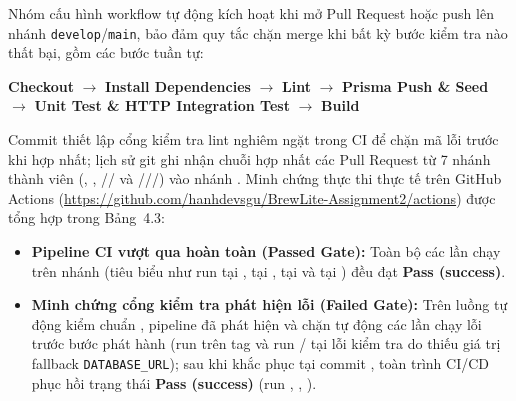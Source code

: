 \documentclass[12pt,a4paper]{report}
\begin{document}
Nhóm cấu hình workflow  tự động kích hoạt khi mở Pull Request hoặc push lên nhánh \texttt{develop}/\texttt{main}, bảo đảm quy tắc chặn merge khi bất kỳ bước kiểm tra nào thất bại, gồm các bước tuần tự:
\begin{center}
\textbf{Checkout} $\rightarrow$ \textbf{Install Dependencies} $\rightarrow$ \textbf{Lint} $\rightarrow$ \textbf{Prisma Push \& Seed} $\rightarrow$ \textbf{Unit Test \& HTTP Integration Test} $\rightarrow$ \textbf{Build}
\end{center}
Commit  thiết lập cổng kiểm tra lint nghiêm ngặt trong CI để chặn mã lỗi trước khi hợp nhất; lịch sử git ghi nhận chuỗi hợp nhất các Pull Request từ 7 nhánh thành viên (, , // và ///) vào nhánh . Minh chứng thực thi thực tế trên GitHub Actions (\url{https://github.com/hanhdevsgu/BrewLite-Assignment2/actions}) được tổng hợp trong Bảng~4.3:
\begin{itemize}[leftmargin=*]
\item \textbf{Pipeline CI vượt qua hoàn toàn (Passed Gate):} Toàn bộ các lần chạy  trên nhánh  (tiêu biểu như run  tại ,  tại ,  tại  và  tại ) đều đạt \textbf{Pass (success)}.
\item \textbf{Minh chứng cổng kiểm tra phát hiện lỗi (Failed Gate):} Trên luồng tự động kiểm chuẩn , pipeline đã phát hiện và chặn tự động các lần chạy lỗi trước bước phát hành (run  trên tag  và run  /  tại  lỗi kiểm tra  do thiếu giá trị fallback \texttt{DATABASE\_URL}); sau khi khắc phục tại commit , toàn trình CI/CD phục hồi trạng thái \textbf{Pass (success)} (run , , ).
\end{itemize}
\end{document}
